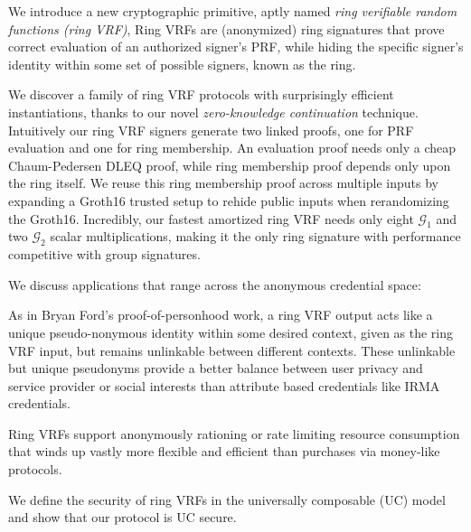 
\def\eprintsmallskip{\smallskip}{}%
We introduce a new cryptographic primitive, aptly named
 \emph{ring verifiable random functions (ring VRF)},
Ring VRFs are (anonymized) ring signatures that prove correct evaluation
of an authorized signer's PRF, while hiding the specific signer's
identity within some set of possible signers, known as the ring.

We discover a family of ring VRF protocols with surprisingly efficient
instantiations, thanks to our novel {\em zero-knowledge continuation} technique.
%
Intuitively our ring VRF signers generate two linked proofs,
 one for PRF evaluation and one for ring membership. 
An evaluation proof needs only a cheap Chaum-Pedersen DLEQ proof,
while ring membership proof depends only upon the ring itself.
We reuse this ring membership proof across multiple inputs
by expanding a Groth16 trusted setup to rehide public inputs when
 rerandomizing the Groth16.
%
Incredibly, our fastest amortized ring VRF needs only eight $\mathcal{G}_1$
 and two $\mathcal{G}_2$ scalar multiplications, 
making it the only ring signature with performance competitive with group signatures.

\eprintsmallskip

We discuss applications that range across the anonymous credential space:

As in Bryan Ford's proof-of-personhood work,
a ring VRF output acts like a unique pseudo-nonymous identity
 within some desired context, given as the ring VRF input,
but remains unlinkable between different contexts. 
These unlinkable but unique pseudonyms provide a better balance
between user privacy and service provider or social interests than
 attribute based credentials like IRMA credentials.

\eprintsmallskip
Ring VRFs support anonymously rationing or rate limiting resource
consumption that winds up vastly more flexible and efficient than
purchases via money-like protocols.

\eprintsmallskip
We define the security of ring VRFs in the universally composable (UC) model and show that our protocol is UC secure.
